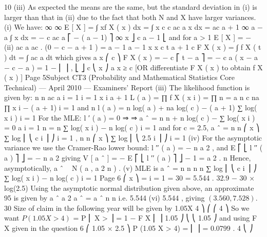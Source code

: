 \documentclass[a4paper,12pt]{article}
\begin{document}
10
(iii) As expected the means are the same,
but the standard deviation in (i) is larger than that in (ii) due to the fact that
both N and X have larger variances.
(i) We have:
∞
∞
E [ X ] = ∫ xf X ( x ) dx = ∫ x
c
c
ac a
x
dx = ac
a + 1
∞
a
− a
∫ x dx = −
c
ac a ⎡ − ( a − 1) ⎤ ∞
x
⎦ c
a − 1 ⎣
and for a > 1
E [ X ] = −
(ii)
ac a
ac
.
(0 − c − a + 1 ) =
a − 1
a − 1
x x
c t a + 1
c
F X ( x ) = ∫ f X ( t ) dt = ∫
ac a
dt
which gives
a
x
⎛ c ⎞
F X ( x ) = − c ⎡ t − a ⎤ = − c a ( x − a − c − a ) = 1 − ⎜ ⎟ ,
⎣ ⎦ c
⎝ x ⎠
a
x ≥ c
[OR differentiate F X ( x ) to obtain f X ( x ) ]
Page 5Subject CT3 (Probability and Mathematical Statistics Core Technical) — April 2010 — Examiners’ Report
(iii)
The likelihood function is given by:
n n ac a
i = 1 i = 1 x i a + 1
L ( a ) = ∏ f X ( x i ) = ∏
n
= a n c na ∏ x i − ( a + 1)
i = 1
and
n
l ( a ) = n log( a ) + na log( c ) − ( a + 1) ∑ log( x i )
i = 1
For the MLE:
l ′ ( a ) = 0 ⇒
⇒ a ˆ =
n
n
+ n log( c ) − ∑ log( x i ) = 0
a
i = 1
n
=
n
∑ log( x i ) − n log( c )
i = 1
and for c = 2.5, a ˆ =
n
n
⎛ x ⎞
∑ log ⎜ ⎝ c i ⎟ ⎠
i = 1
,
n
n
⎛ x ⎞
∑ log ⎜ ⎝ 2.5 i ⎟ ⎠
i = 1
(iv)
For the asymptotic variance we use the Cramer-Rao lower bound:
l ′′ ( a ) = −
n
a
2
, and E ⎡ ⎣ l ′′ ( a ) ⎤ ⎦ = −
n
a 2
giving
{
}
V [ a ˆ ] = − E ⎡ ⎣ l ′′ ( a ) ⎤ ⎦
− 1
=
a 2
.
n
Hence, asymptotically, a ˆ ~ N ( a , a 2 n ) .
(v)
MLE is
a ˆ =
n
n
n
n
∑ log ⎜ ⎝ c i ⎟ ⎠ ∑ log( x i ) − n log( c )
i = 1
Page 6
⎛ x ⎞
=
i = 1
=
30
= 5.544 .
32.9 − 30 × log(2.5)
Using the asymptotic normal distribution given above, an approximate 95%
is given by
a ˆ 
a 2
a ˆ
= a ˆ 
n
n
i.e. 5.544 
(vi)
5.544
, giving $(3.560, 7.528)$.
30
Size of claim in the following year will be given by 1.05X
4 ⎞
⎛
⎛ 4 ⎞
So we want $P (1.05 X > 4)$ = P ⎜ X >
⎟ = 1 − F X ⎜
⎟
1.05 ⎠
⎝
⎝ 1.05 ⎠
and using F X given in the question
6
⎛ 1.05 × 2.5 ⎞
P (1.05 X > 4) = ⎜
⎟ = 0.0799 .
4
⎝
⎠

\end{document}
